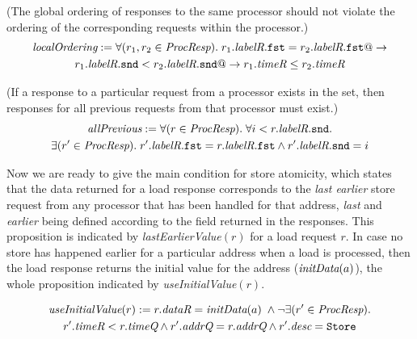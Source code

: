 \vspace{-.3in}

\begin{defn} (The global ordering of responses to the same processor should not
violate the ordering of the corresponding requests within the processor.)
\small
\begin{multline*}
\textit{localOrdering} :=
\forall (r_1, r_2 \in \textit{ProcResp}). \; r_1.\textit{labelR}.\texttt{fst} = r_2.\textit{labelR}.\texttt{fst} @->\\
r_1.\textit{labelR}.\texttt{snd} < r_2.\textit{labelR}.\texttt{snd} @-> r_1.\textit{timeR} \le r_2.\textit{timeR}
\end{multline*}
\label{localOrdering}
\end{defn}

\vspace{-.3in}

\begin{defn} (If a response to a particular request from a processor exists in the \Response{} set,
then responses for all previous requests from that processor must exist.)
\small
\begin{multline*}
\textit{allPrevious} :=
\forall (r \in \textit{ProcResp}). \; \forall i < r.\textit{labelR}.\texttt{snd}. \\
\exists (r' \in \textit{ProcResp}). \; r'.\textit{labelR}.\texttt{fst} = r.\textit{labelR}.\texttt{fst} \wedge r'.\textit{labelR}.\texttt{snd} = i
\end{multline*}
\label{allPrevious}
\end{defn}

\vspace{-.3in}

Now we are ready to give the main condition for store atomicity, which states that the
data returned for a load response corresponds to the \emph{last earlier} store
request from any processor that has been handled for that address, \emph{last}
and \emph{earlier} being defined according to the field \timeR{} returned in
the responses.  This proposition is indicated by \textit{lastEarlierValue}$(r)$
for a load request $r$.  In case no store has happened earlier for a particular
address when a load is processed, then the load response returns the initial
value for the address ($\textit{initData}(a)$), the whole proposition indicated by
\textit{useInitialValue}$(r)$.
\begin{defn}
\small
\begin{multline*}
\textit{useInitialValue}(r) := r.\textit{dataR} = \textit{initData}(a) \; \wedge \neg \exists (r' \in \textit{ProcResp}). \\
r'.\textit{timeR} < r.\textit{timeQ} \wedge r'.\textit{addrQ} = r.\textit{addrQ} \wedge r'.\textit{desc} = \texttt{Store}
\end{multline*}
\label{useInitialValue}
\end{defn}


